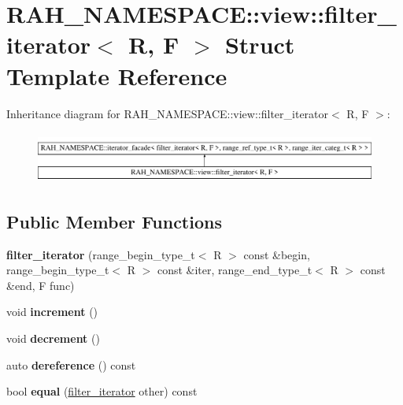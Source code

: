 \hypertarget{struct_r_a_h___n_a_m_e_s_p_a_c_e_1_1view_1_1filter__iterator}{}\section{R\+A\+H\+\_\+\+N\+A\+M\+E\+S\+P\+A\+CE\+::view\+::filter\+\_\+iterator$<$ R, F $>$ Struct Template Reference}
\label{struct_r_a_h___n_a_m_e_s_p_a_c_e_1_1view_1_1filter__iterator}
Inheritance diagram for R\+A\+H\+\_\+\+N\+A\+M\+E\+S\+P\+A\+CE\+::view\+::filter\+\_\+iterator$<$ R, F $>$\+:\begin{figure}[H]
\begin{center}
\leavevmode
\includegraphics[height=1.712538cm]{struct_r_a_h___n_a_m_e_s_p_a_c_e_1_1view_1_1filter__iterator}
\end{center}
\end{figure}
\subsection*{Public Member Functions}
\begin{DoxyCompactItemize}
\item 
\mbox{\label{struct_r_a_h___n_a_m_e_s_p_a_c_e_1_1view_1_1filter__iterator_ae4f5eb6b3eb823038ef8fa0d1806995a}} 
{\bfseries filter\+\_\+iterator} (range\+\_\+begin\+\_\+type\+\_\+t$<$ R $>$ const \&begin, range\+\_\+begin\+\_\+type\+\_\+t$<$ R $>$ const \&iter, range\+\_\+end\+\_\+type\+\_\+t$<$ R $>$ const \&end, F func)
\item 
\mbox{\label{struct_r_a_h___n_a_m_e_s_p_a_c_e_1_1view_1_1filter__iterator_a3519fbd8143b3bf5402eef99d690a47a}} 
void {\bfseries increment} ()
\item 
\mbox{\label{struct_r_a_h___n_a_m_e_s_p_a_c_e_1_1view_1_1filter__iterator_aeff224e6abd4739e22439570377ebb33}} 
void {\bfseries decrement} ()
\item 
\mbox{\label{struct_r_a_h___n_a_m_e_s_p_a_c_e_1_1view_1_1filter__iterator_a12c400545fa208b97848e2036cf719ee}} 
auto {\bfseries dereference} () const
\item 
\mbox{\label{struct_r_a_h___n_a_m_e_s_p_a_c_e_1_1view_1_1filter__iterator_a22b7c003a179251a82020adf3581fb41}} 
bool {\bfseries equal} (\mbox{\hyperlink{struct_r_a_h___n_a_m_e_s_p_a_c_e_1_1view_1_1filter__iterator}{filter\+\_\+iterator}} other) const
\end{DoxyCompactItemize}
